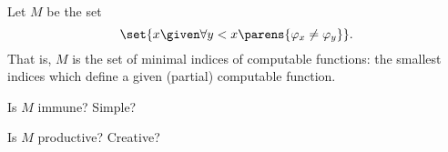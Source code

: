 \begin{problem}
  Let $M$ be the set
  \[ \set{ x \given \forall y < x \parens{ \varphi_x \neq \varphi_y } }. \]
  That is, $M$ is the set of minimal indices of computable functions:
  the smallest indices which define a given (partial) computable function.

  \begin{enumalph}
    \item Is $M$ immune? Simple?
      \begin{answer}
        
      \end{answer}
    \item Is $M$ productive? Creative?
      \begin{answer}
        
      \end{answer}
  \end{enumalph}
\end{problem}
